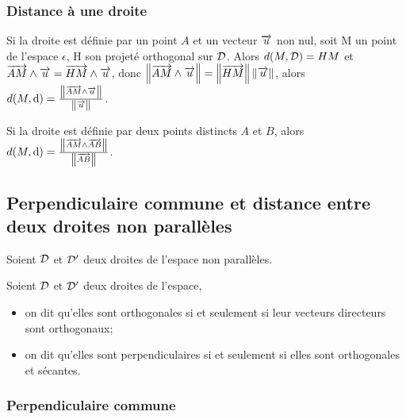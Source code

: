 \subsubsection{Distance à une droite}

Si la droite est définie par un point $A$ et un vecteur $\overrightarrow{u}$ non nul, soit M un point de l'espace $\epsilon$, H son projeté orthogonal sur $\mathcal{D}$. Alors $d(M,\mathcal{D})=HM$ et $\overrightarrow{AM}\wedge\overrightarrow{u}=\overrightarrow{HM}\wedge\overrightarrow{u}$, donc $\left\lVert\overrightarrow{AM}\wedge\overrightarrow{u}\right\rVert=\left\lVert\overrightarrow{HM}\right\rVert\left\lVert\overrightarrow{u}\right\rVert$, alors $d(M,\mathrm{d})=\frac{\left\lVert\overrightarrow{AM}\wedge\overrightarrow{u}\right\rVert}{\left\lVert\overrightarrow{u}\right\rVert}$.

Si la droite est définie par deux points distincts $A$ et $B$, alors $d(M,\mathrm{d})=\frac{\left\lVert\overrightarrow{AM}\wedge\overrightarrow{AB}\right\rVert}{\left\lVert\overrightarrow{AB}\right\rVert}$.

\subsection{Perpendiculaire commune et distance entre deux droites non parallèles}

Soient $\mathcal{D}$ et $\mathcal{D}'$ deux droites de l'espace non parallèles.
\begin{defdef}
  Soient $\mathcal{D}$ et $\mathcal{D}'$ deux droites de l'espace,
  \begin{itemize}
  \item on dit qu'elles sont orthogonales si et seulement si leur vecteurs directeurs sont orthogonaux;
  \item on dit qu'elles sont perpendiculaires si et seulement si elles sont orthogonales et sécantes.
  \end{itemize}
\end{defdef}

\subsubsection{Perpendiculaire commune}

